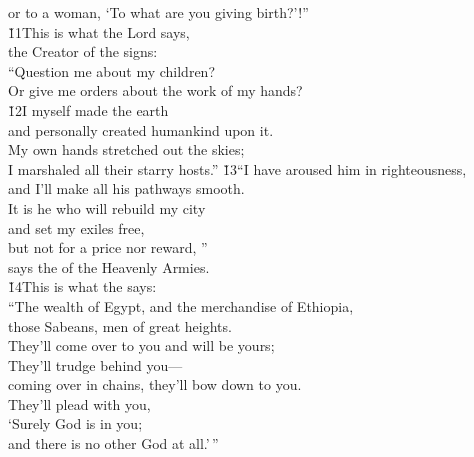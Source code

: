 \begin{poetry}
\poemlll       or to a woman, `To what are you giving birth?'!'' \\
\poeml \v{11}This is what the Lord says, \\
\poemll    the Creator of the signs: \\
\poeml ``Question me about my children? \\
\poemll    Or give me orders about the work of my hands? \\
\poeml \v{12}I myself made the earth \\
\poemll    and personally created humankind upon it. \\
\poeml My own hands stretched out the skies; \\
\poemll    I marshaled all their starry hosts.''
\poeml \v{13}``I have aroused him in righteousness, \\
\poemll    and I'll make all his pathways smooth. \\
\poeml It is he who will rebuild my city \\
\poemll    and set my exiles free, \\
\poeml but not for a price nor reward, '' \\
\poemll    says the  of the Heavenly Armies. \\
\poeml \v{14}This is what the  says: \\
\poeml ``The wealth of Egypt, and the merchandise of Ethiopia, \\
\poemll    those Sabeans, men of great heights. \\
\poeml They'll come over to you and will be yours; \\
\poemll    They'll trudge behind you--- \\
\poemlll       coming over in chains, they'll bow down to you. \\
\poeml They'll plead with you, \\
\poemll    `Surely God is in you; \\
\poemlll       and there is no other God at all.'\,''

\end{poetry}
